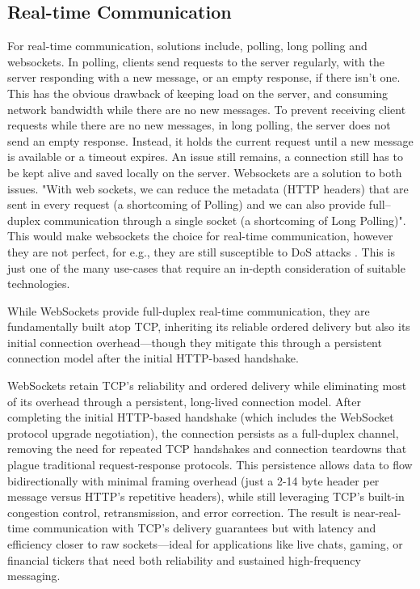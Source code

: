 \documentclass[]{final}
\begin{document}
\subsection{Real-time Communication}

For
real-time communication, solutions include, polling, long polling and websockets. In polling,
clients send requests to the server regularly, with the server responding with a new message, or
an empty response, if there isn't one. This has the obvious drawback of keeping load on the server,
and consuming network bandwidth while there are no new messages. To prevent receiving client requests
while there are no new messages, in long polling, the server does not send an empty response. Instead,
it holds the current request until a new message is available or a timeout expires. An issue still remains,
a connection still has to be kept alive and saved locally on the server. Websockets are a
solution to both issues. "With web sockets, we can reduce the metadata (HTTP headers) that are sent in
every request (a shortcoming of Polling) and we can also provide full–duplex communication through a
single socket (a shortcoming of Long Polling)". This would make websockets the choice for real-time
communication, however they are not perfect, for e.g., they are still susceptible to DoS attacks
\cite{gupta_overview_2018}. This is just one of the many use-cases that require an in-depth consideration
of suitable technologies.


While WebSockets provide full-duplex real-time communication, they are
fundamentally built atop TCP, inheriting its reliable ordered delivery but
also its initial connection overhead—though they mitigate this through a
persistent connection model after the initial HTTP-based handshake.

WebSockets retain TCP's reliability and ordered delivery while eliminating most
of its overhead through a persistent, long-lived connection model. After
completing the initial HTTP-based handshake (which includes the WebSocket
protocol upgrade negotiation), the connection persists as a full-duplex
channel, removing the need for repeated TCP handshakes and connection
teardowns that plague traditional request-response protocols. This persistence
allows data to flow bidirectionally with minimal framing overhead (just a 2-14
byte header per message versus HTTP's repetitive headers), while still
leveraging TCP's built-in congestion control, retransmission, and error
correction. The result is near-real-time communication with TCP's delivery
guarantees but with latency and efficiency closer to raw sockets—ideal for
applications like live chats, gaming, or financial tickers that need both
reliability and sustained high-frequency messaging.
\end{document}
